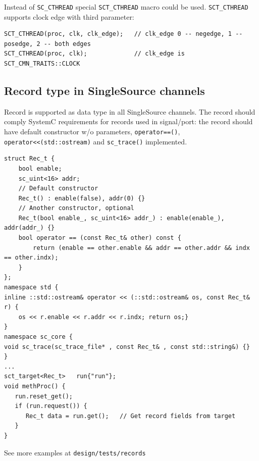 Instead of {\tt SC\_CTHREAD} special {\tt SCT\_CTHREAD} macro could be used. {\tt SCT\_CTHREAD} supports clock edge with third parameter:

\begin{lstlisting}[style=mycpp]
SCT_CTHREAD(proc, clk, clk_edge);   // clk_edge 0 -- negedge, 1 -- posedge, 2 -- both edges
SCT_CTHREAD(proc, clk);             // clk_edge is SCT_CMN_TRAITS::CLOCK
\end{lstlisting}

\subsection{Record type in SingleSource channels}

Record is supported as data type in all SingleSource channels. The record should comply SystemC requirements for records used in signal/port: the record should have default constructor w/o parameters, {\tt operator==()}, {\tt operator<<(std::ostream)} and {\tt sc\_trace()} implemented.

\begin{lstlisting}[style=mycpp]
struct Rec_t {
    bool enable;
    sc_uint<16> addr;
    // Default constructor
    Rec_t() : enable(false), addr(0) {}
    // Another constructor, optional
    Rec_t(bool enable_, sc_uint<16> addr_) : enable(enable_), addr(addr_) {}    
    bool operator == (const Rec_t& other) const {
        return (enable == other.enable && addr == other.addr && indx == other.indx);
    }
};
namespace std {
inline ::std::ostream& operator << (::std::ostream& os, const Rec_t& r) {
    os << r.enable << r.addr << r.indx; return os;}
}
namespace sc_core {
void sc_trace(sc_trace_file* , const Rec_t& , const std::string&) {}
}
...
sct_target<Rec_t>   run{"run"};
void methProc() {
   run.reset_get();
   if (run.request()) {
      Rec_t data = run.get();   // Get record fields from target
   }
}
\end{lstlisting}

See more examples at {\tt design/tests/records}

\begin{lstlisting}[style=mycpp]
\end{lstlisting}
